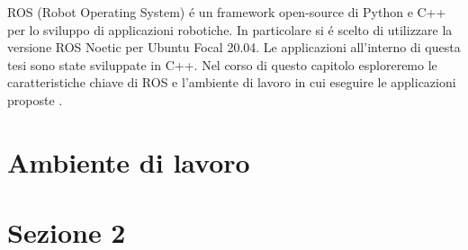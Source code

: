 ROS (Robot Operating System) \'{e} un framework open-source di Python e C++ per lo sviluppo di applicazioni robotiche.
In particolare si \'{e} scelto di utilizzare la versione ROS Noetic per Ubuntu Focal 20.04.
Le applicazioni all'interno di questa tesi sono state sviluppate in C++.
Nel corso di questo capitolo esploreremo le caratteristiche chiave di ROS e l'ambiente di lavoro in cui eseguire 
le applicazioni proposte \cite{ros}.

\section{Ambiente di lavoro}


\section{Sezione 2}
